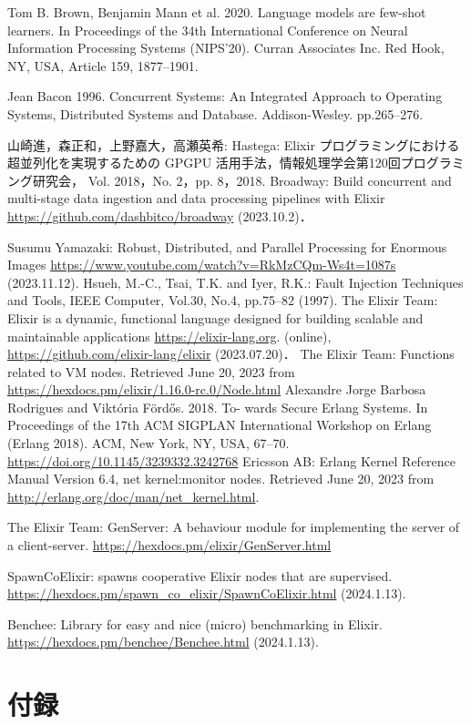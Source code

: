 \documentclass[a4paper]{jreport}	%
\begin{document}
\newpage
{}
\renewcommand{\bibname}{参考文献}

%
%

\begin{thebibliography}{99}

Tom B. Brown, Benjamin Mann et al. 2020. Language models are few-shot learners. In Proceedings of the 34th International Conference on Neural Information Processing Systems (NIPS'20). Curran Associates Inc. Red Hook, NY, USA, Article 159, 1877--1901.

Jean Bacon 1996. Concurrent Systems: An Integrated Approach to Operating Systems, Distributed Systems and Database. Addison-Wesley. pp.265--276.

山崎進，森正和，上野嘉大，高瀬英希: Hastega: Elixir プログラミングにおける超並列化を実現するための GPGPU 活用手法，情報処理学会第120回プログラミング研究会， Vol. 2018，No. 2，pp. 8，2018.
Broadway: Build concurrent and multi-stage data ingestion and data processing pipelines with Elixir \url{https://github.com/dashbitco/broadway} (2023.10.2)．

Susumu Yamazaki: Robust, Distributed, and Parallel Processing for Enormous Images \url{https://www.youtube.com/watch?v=RkMzCQm-Ws4t=1087s} (2023.11.12).
Hsueh, M.-C., Tsai, T.K. and Iyer, R.K.: Fault Injection Techniques and Tools, IEEE Computer, Vol.30, No.4, pp.75--82 (1997).
The Elixir Team: Elixir is a dynamic, functional language designed for building scalable and maintainable applications \url{https://elixir-lang.org}. (online), \url{https://github.com/elixir-lang/elixir} (2023.07.20)．
The Elixir Team: Functions related to VM nodes. Retrieved June 20, 2023 from \url{https://hexdocs.pm/elixir/1.16.0-rc.0/Node.html}
Alexandre Jorge Barbosa Rodrigues and Viktória Fördős. 2018. To- wards Secure Erlang Systems. In Proceedings of the 17th ACM SIGPLAN International Workshop on Erlang (Erlang 2018). ACM, New York, NY, USA, 67--70. \url{https://doi.org/10.1145/3239332.3242768}
Ericsson AB: Erlang Kernel Reference Manual Version 6.4, net kernel:monitor nodes. Retrieved June 20, 2023 from \url{http://erlang.org/doc/man/net_kernel.html}.

The Elixir Team: GenServer: A behaviour module for implementing the server of a client-server. \url{https://hexdocs.pm/elixir/GenServer.html}  

SpawnCoElixir: spawns cooperative Elixir nodes that are supervised. \url{https://hexdocs.pm/spawn_co_elixir/SpawnCoElixir.html} (2024.1.13).

Benchee: Library for easy and nice (micro) benchmarking in Elixir.
\url{https://hexdocs.pm/benchee/Benchee.html} (2024.1.13).

\chapter*{付録}


\end{thebibliography}
\end{document}
